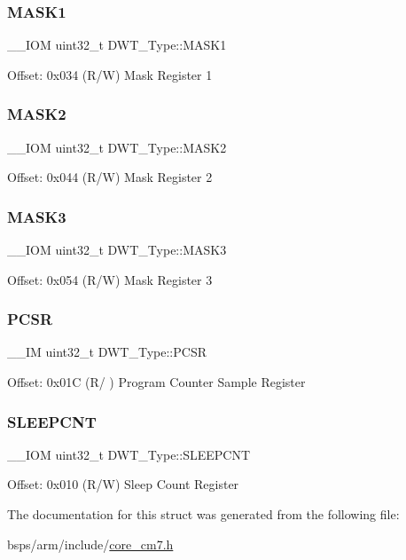 \subsubsection{\texorpdfstring{MASK1}{MASK1}}
{\footnotesize\ttfamily \+\_\+\+\_\+\+I\+OM uint32\+\_\+t D\+W\+T\+\_\+\+Type\+::\+M\+A\+S\+K1}

Offset\+: 0x034 (R/W) Mask Register 1 \mbox{\label{structDWT__Type_a00ac4d830dfe0070a656cda9baed170f}} 
\subsubsection{\texorpdfstring{MASK2}{MASK2}}
{\footnotesize\ttfamily \+\_\+\+\_\+\+I\+OM uint32\+\_\+t D\+W\+T\+\_\+\+Type\+::\+M\+A\+S\+K2}

Offset\+: 0x044 (R/W) Mask Register 2 \mbox{\label{structDWT__Type_a2a509d8505c37a3b64f6b24993df5f3f}} 
\subsubsection{\texorpdfstring{MASK3}{MASK3}}
{\footnotesize\ttfamily \+\_\+\+\_\+\+I\+OM uint32\+\_\+t D\+W\+T\+\_\+\+Type\+::\+M\+A\+S\+K3}

Offset\+: 0x054 (R/W) Mask Register 3 \mbox{\label{structDWT__Type_a6353ca1d1ad9bc1be05d3b5632960113}} 
\subsubsection{\texorpdfstring{PCSR}{PCSR}}
{\footnotesize\ttfamily \+\_\+\+\_\+\+IM uint32\+\_\+t D\+W\+T\+\_\+\+Type\+::\+P\+C\+SR}

Offset\+: 0x01C (R/ ) Program Counter Sample Register \mbox{\label{structDWT__Type_a416a54e2084ce66e5ca74f152a5ecc70}} 
\subsubsection{\texorpdfstring{SLEEPCNT}{SLEEPCNT}}
{\footnotesize\ttfamily \+\_\+\+\_\+\+I\+OM uint32\+\_\+t D\+W\+T\+\_\+\+Type\+::\+S\+L\+E\+E\+P\+C\+NT}

Offset\+: 0x010 (R/W) Sleep Count Register 

The documentation for this struct was generated from the following file\+:\begin{DoxyCompactItemize}
\item 
bsps/arm/include/\mbox{\hyperlink{core__cm7_8h}{core\+\_\+cm7.\+h}}\end{DoxyCompactItemize}
